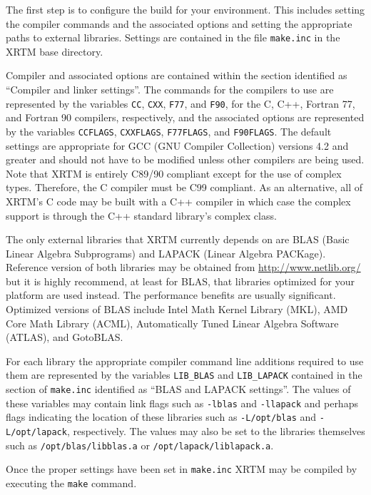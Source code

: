 The first step is to configure the build for your environment.  This includes setting the compiler commands and the associated options and setting the appropriate paths to external libraries.  Settings are contained in the file \texttt{make.inc} in the XRTM base directory.

Compiler and associated options are contained within the section identified as ``Compiler and linker settings''.  The commands for the compilers to use are represented by the variables \texttt{CC}, \texttt{CXX}, \texttt{F77}, and \texttt{F90}, for the C, C++, Fortran 77, and Fortran 90 compilers, respectively, and the associated options are represented by the variables \texttt{CCFLAGS}, \texttt{CXXFLAGS}, \texttt{F77FLAGS}, and \texttt{F90FLAGS}.  The default settings are appropriate for GCC (GNU Compiler Collection) versions 4.2 and greater and should not have to be modified unless other compilers are being used.  Note that XRTM is entirely C89/90 compliant except for the use of complex types.  Therefore, the C compiler must be C99 compliant.  As an alternative, all of XRTM's C code may be built with a C++ compiler in which case the complex support is through the C++ standard library's complex class.

The only external libraries that XRTM currently depends on are BLAS (Basic Linear Algebra Subprograms) and LAPACK (Linear Algebra PACKage).  Reference version of both libraries may be obtained from \url{http://www.netlib.org/} but it is highly recommend, at least for BLAS, that libraries optimized for your platform are used instead.  The performance benefits are usually significant.  Optimized versions of BLAS include Intel Math Kernel Library (MKL), AMD Core Math Library (ACML), Automatically Tuned Linear Algebra Software (ATLAS), and GotoBLAS.  

For each library the appropriate compiler command line additions required to use them are represented by the variables \texttt{LIB\_BLAS} and \texttt{LIB\_LAPACK} contained in the section of \texttt{make.inc} identified as ``BLAS and LAPACK settings''.  The values of these variables may contain link flags such as \texttt{-lblas} and \texttt{-llapack} and perhaps flags indicating the location of these libraries such as \texttt{-L/opt/blas} and \texttt{-L/opt/lapack}, respectively.  The values may also be set to the libraries themselves such as \texttt{/opt/blas/libblas.a} or \texttt{/opt/lapack/liblapack.a}.

Once the proper settings have been set in \texttt{make.inc} XRTM may be compiled by executing the \texttt{make} command.


